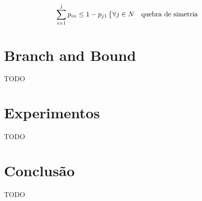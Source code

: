 \documentclass[a4paper,11pt,twoside]{article}
\begin{document}
\begin{equation}
  \sum_{i=1}^j p_{in} \leq 1 - p_{j1} \begin{dcases*} \forall j \in N & quebra de simetria \end{dcases*}
  \label{sem_simetria}
\end{equation}

\section{Branch and Bound}
TODO

\section{Experimentos}
TODO

\section{Conclusão}
TODO
\end{document}
